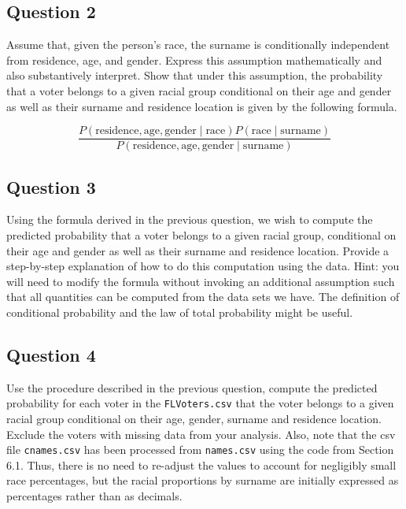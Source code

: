 \documentclass[]{article}
\begin{document}
\subsection{Question 2}\label{question-2}

Assume that, given the person's race, the surname is conditionally
independent from residence, age, and gender. Express this assumption
mathematically and also substantively interpret. Show that under this
assumption, the probability that a voter belongs to a given racial group
conditional on their age and gender as well as their surname and
residence location is given by the following formula.

\[
    \frac{P(\text{residence}, \text{age}, \text{gender} \mid \text{race}) 
      P(\text{race} \mid \text{surname})}{P(\text{residence}, \text{age}, \text{gender} \mid \text{surname})}    
\]

\subsection{Question 3}\label{question-3}

Using the formula derived in the previous question, we wish to compute
the predicted probability that a voter belongs to a given racial group,
conditional on their age and gender as well as their surname and
residence location. Provide a step-by-step explanation of how to do this
computation using the data. Hint: you will need to modify the formula
without invoking an additional assumption such that all quantities can
be computed from the data sets we have. The definition of conditional
probability and the law of total probability might be useful.

\subsection{Question 4}\label{question-4}

Use the procedure described in the previous question, compute the
predicted probability for each voter in the \texttt{FLVoters.csv} that
the voter belongs to a given racial group conditional on their age,
gender, surname and residence location. Exclude the voters with missing
data from your analysis. Also, note that the csv file
\texttt{cnames.csv} has been processed from \texttt{names.csv} using the
code from Section 6.1. Thus, there is no need to re-adjust the values to
account for negligibly small race percentages, but the racial
proportions by surname are initially expressed as percentages rather
than as decimals.
\end{document}
